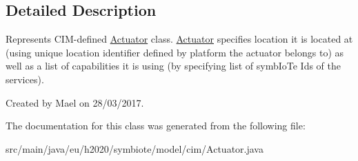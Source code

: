 \subsection{Detailed Description}
Represents C\+I\+M-\/defined \hyperlink{classeu_1_1h2020_1_1symbiote_1_1model_1_1cim_1_1Actuator}{Actuator} class. \hyperlink{classeu_1_1h2020_1_1symbiote_1_1model_1_1cim_1_1Actuator}{Actuator} specifies location it is located at (using unique location identifier defined by platform the actuator belongs to) as well as a list of capabilities it is using (by specifying list of symb\+Io\+Te Ids of the services).

Created by Mael on 28/03/2017. 

The documentation for this class was generated from the following file\+:\begin{DoxyCompactItemize}
\item 
src/main/java/eu/h2020/symbiote/model/cim/Actuator.\+java\end{DoxyCompactItemize}
